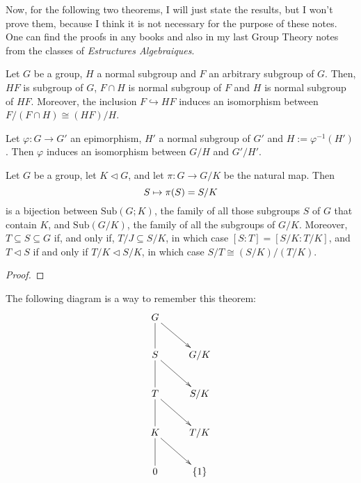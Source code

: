 \documentclass[../main.tex]{subfiles}
\begin{document}
Now, for the following two theorems, I will just state the results, but I won't prove them, because I think it is not necessary for the purpose of these notes. One can find the proofs in any books and also in my last Group Theory notes from the classes of \textit{Estructures Algebraiques}.

\begin{ter}
\label{ter:secondisomorphism} Let $G$ be a group, $H$ a normal subgroup and $F$ an arbitrary subgroup of $G$. Then, $HF$ is subgroup of $G$, $F\cap H$ is normal subgroup of $F$ and $H$ is normal subgroup of $HF$. Moreover, the inclusion $F\hookrightarrow HF$ induces an isomorphism between $F/(F\cap H)\cong (HF)/H$.
\end{ter}

\begin{ter}
\label{ter:thirdisomorphism} Let $\varphi:G\rightarrow G'$ an epimorphism, $H'$ a normal subgroup of $G'$ and $H:=\varphi^{-1}(H')$. Then $\varphi$ induces an isomorphism between $G/H$ and $G'/H'$.
\end{ter}


\begin{prop}
\label{prop:correspondencetheorem} Let $G$ be a group, let $K\vartriangleleft G$, and let $\pi:G\rightarrow G/K$ be the natural map. Then
\begin{equation}
    \notag
    S\mapsto\pi(S) = S/K
\end{equation}
is a bijection between $\mathrm{Sub}(G;K)$, the family of all those subgroups $S$ of $G$ that contain $K$, and $\mathrm{Sub}(G/K)$, the family of all the subgroups of $G/K$. Moreover, $T\subseteq S\subseteq G$ if, and only if, $T/J\subseteq S/K$, in which case $[S:T] = [S/K : T/K]$, and $T\vartriangleleft S$ if and only if $T/K\vartriangleleft S/K$, in which case $S/T\cong (S/K)/(T/K)$.
\end{prop}
\begin{proof}
\noproof
\end{proof}

The following diagram is a way to remember this theorem:
\begin{equation}
    \notag
    \xymatrix{
    G \ar[dr]\ar@{-}[d] & \\
    S \ar[dr]\ar@{-}[d] & G/K \\
    T \ar[dr]\ar@{-}[d] & S/K \\
    K \ar[dr]\ar@{-}[d] & T/K \\
    0 & \{1\}
    }
\end{equation}
\end{document}
